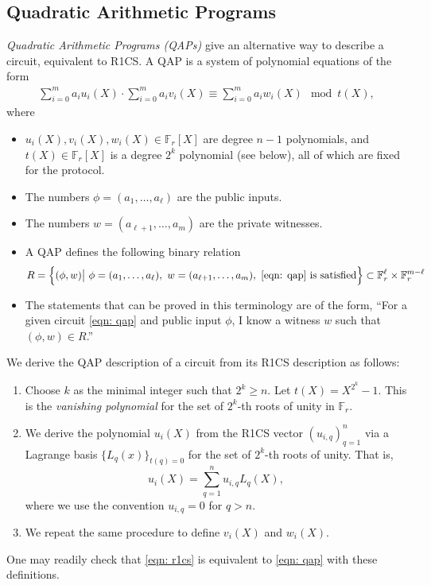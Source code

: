 \subsection{Quadratic Arithmetic Programs}
\emph{Quadratic Arithmetic Programs (QAPs)} give an alternative way to describe a circuit, equivalent to R1CS. A QAP is a system of polynomial equations of the form
\begin{align}
\sum_{i=0}^m a_i u_i(X) \cdot \sum_{i=0}^m a_i v_i(X) \equiv \sum_{i=0}^m a_i w_i(X) \mod t(X), \label{eqn: qap}
\end{align}
where 
\begin{itemize}
\item $u_i(X), v_i(X), w_i(X) \in \mathbb{F}_r[X]$ are degree $n-1$ polynomials, and $t(X) \in \mathbb{F}_r[X]$ is a degree $2^k$ polynomial (see below), all of which are fixed for the protocol.
\item The numbers $\phi = (a_1, \dots, a_\ell)$ are the public inputs.
\item The numbers $w = (a_{\ell + 1}, \dots, a_m)$ are the private witnesses.
\item A QAP defines the following binary relation
\begin{align}
R = \left\{ (\phi, w) \big| \ \phi = (a_1, \dots, a_\ell), \ w = (a_{\ell + 1}, \dots, a_m), \ \eqref{eqn: qap} \textrm{ is satisfied} \right\} \subset \mathbb{F}_r^\ell \times \mathbb{F}_r^{m-\ell}
\end{align}
\item The statements that can be proved in this terminology are of the form, ``For a given circuit \eqref{eqn: qap} and public input $\phi$, I know a witness $w$ such that $(\phi, w) \in R$.''
\end{itemize}

We derive the QAP description of a circuit from its R1CS description as follows:
\begin{enumerate}
    \item Choose $k$ as the minimal integer such that $2^k \geq n$. Let $t(X) = X^{2^k} - 1$. This is the \emph{vanishing polynomial} for the set of $2^k$-th roots of unity in $\mathbb{F}_r$.
    \item We derive the polynomial $u_i(X)$ from the R1CS vector $(u_{i,q})_{q=1}^n$ via a Lagrange basis $\{ L_q(x) \}_{t(q) = 0}$ for the set of $2^k$-th roots of unity.  That is,
    \begin{equation}\label{eq: interpolate}
        u_i(X) = \sum_{q=1}^n u_{i,q} L_q(X),
    \end{equation}
    where we use the convention $u_{i,q} = 0$ for $q > n$.
    \item We repeat the same procedure to define $v_i(X)$ and $w_i(X)$.
\end{enumerate}
One may readily check that \eqref{eqn: r1cs} is equivalent to \eqref{eqn: qap} with these definitions.

